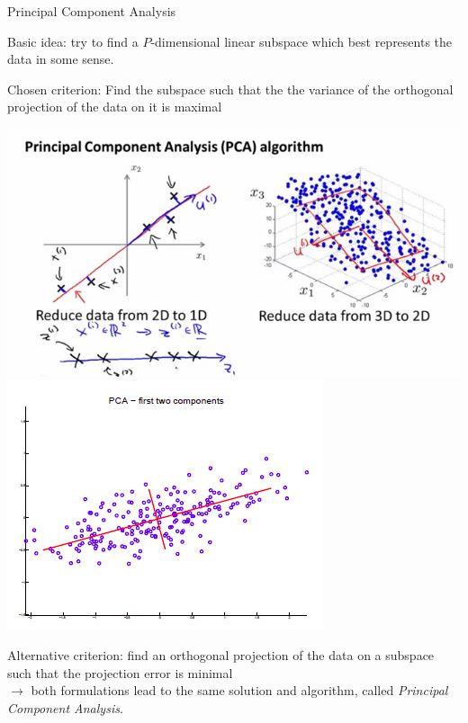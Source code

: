 \documentclass{beamer}
\begin{document}
\begin{frame}{Principal Component Analysis}

Basic idea: try to find a $P$-dimensional linear subspace which best represents the data in some sense.\\
\vspace{0.2cm}


Chosen criterion: Find the subspace such that the the variance of the orthogonal projection of the data on it is maximal


\begin{center}
\includegraphics[scale=0.37]{pca_ex.jpg}
\includegraphics[scale=1.3]{pca_ex_1.jpg}\\
\end{center}
\vspace{-0.2cm}
Alternative criterion: find an orthogonal projection of the data on a subspace such that the projection error is minimal\\
\vspace{0.2cm}
$\rightarrow$ both formulations lead to the same solution and algorithm, called \emph{Principal Component Analysis}.

\end{frame}
\end{document}
